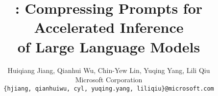 \documentclass[11pt]{article}
\title{{\sysname{}}: Compressing Prompts for Accelerated Inference \\of Large Language Models}
\author{Huiqiang Jiang,
Qianhui Wu,
Chin-Yew Lin,
Yuqing Yang,
Lili Qiu \\
Microsoft Corporation \\
\tt \{hjiang, qianhuiwu, cyl, yuqing.yang, liliqiu\}@microsoft.com \\
}
\begin{document}
\maketitle
\begin{abstract}

\end{abstract}











\appendix

\end{document}
